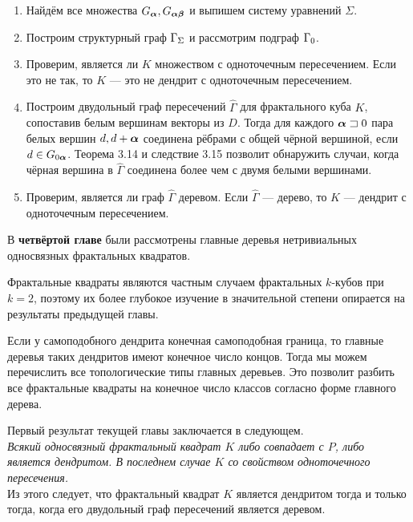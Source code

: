 \documentclass[a5paper,9pt,twoside]{extarticle} %
\begin{document}
\begin{enumerate}[nolistsep]

\item Найдём все множества $G_{\bm{\alpha}}, G_{{\bm{\alpha}}{\bm{\beta}}}$ и выпишем систему уравнений $\Sigma$.

\item Построим структурный граф $\Gamma_\Sigma$ и рассмотрим подграф $\Gamma_0$.

\item Проверим, является ли $K$ множеством с одноточечным пересечением.
Если это не так, то $K$ --- это не дендрит с одноточечным пересечением.

\item Построим двудольный граф пересечений $\hat\Gamma$ для фрактального куба $K$, сопоставив белым вершинам векторы из $D$.
Тогда для каждого ${\bm{\alpha}}\sqsupset0$ пара белых вершин $d, d+{\bm{\alpha}}$ соединена рёбрами с общей чёрной вершиной, если $d\in G_{0{\bm{\alpha}}}$.
Теорема 3.14 и следствие 3.15 позволит обнаружить случаи, когда чёрная вершина в $\hat\Gamma$ соединена более чем с двумя белыми вершинами.

\item Проверим, является ли граф $\hat\Gamma$ деревом.
Если $\hat\Gamma$ --- дерево, то $K$ --- дендрит с одноточечным пересечением.
\end{enumerate}



В {\bf четвёртой главе} были рассмотрены главные деревья нетривиальных односвязных фрактальных квадратов.

Фрактальные квадраты являются частным случаем фрактальных $k$-кубов при $k=2$, поэтому их более глубокое изучение в значительной степени опирается на результаты предыдущей главы.

Если у самоподобного дендрита конечная самоподобная граница, то главные деревья таких дендритов имеют конечное число концов.
Тогда мы можем перечислить все топологические типы главных деревьев.
Это позволит разбить все фрактальные квадраты на конечное число классов согласно форме главного дерева.

Первый результат текущей главы заключается в следующем.\\

{\em Всякий односвязный фрактальный квадрат $K$ либо совпадает с $P$, либо является дендритом.
В последнем случае $K$ со свойством одноточечного пересечения.}\\

Из этого следует, что фрактальный квадрат $K$ является дендритом тогда и только тогда, когда его двудольный граф пересечений является деревом.\\
\end{document}
